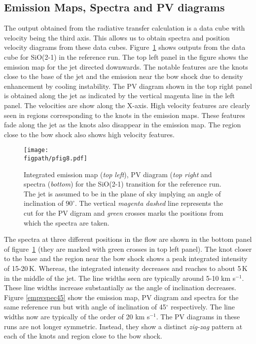 \documentclass[useAMS,usenatbib]{mn2e}
\newcommand{\figpath}{/home/phybva/SiOJets_New/PAPER/NEWFIGS}
\begin{document}
\subsection{Emission Maps, Spectra and PV diagrams}
\label{ssec:emspecpv}
The output obtained from the radiative transfer calculation is a data
cube with velocity being the third axis. This allows us to obtain
spectra and position velocity diagrams from these data cubes. 
Figure~\ref{empvspec90} shows outputs from the data
cube for SiO(2-1) in the reference run. 
The top left panel in the figure shows the emission map for the jet
directed downwards. The notable features are the knots close to the
base of the jet and the emission near the bow shock due to density
enhancement by cooling instability. The PV diagram shown in the top
right panel is obtained along the jet as indicated by the vertical magenta
line in the left panel. The velocities are show along the X-axis. High velocity features
are clearly seen in regions corresponding to the knots in the emission
maps. These features fade along the jet as the knots also disappear in
the emission map. The region close to the bow shock also shows high
velocity features.
%

\begin{figure}
 \texttt{[image: \\figpath/pfig8.pdf]}%
 \caption{Integrated emission map ({\it top left}), PV diagram ({\it top right}
   and spectra ({\it bottom}) for the
   SiO(2-1) transition for the reference run. 
   The jet is assumed to be in the plane of sky implying an angle of
   inclination of $90^{\circ}$. The vertical {\it magenta dashed} line
   represents the cut for the PV digram and {\it green} crosses marks the positions from which the spectra are taken.} 
\label{empvspec90}
\end{figure}

The spectra at three different positions in the flow are shown in the
bottom panel of figure~\ref{empvspec90} (they are marked with green
crosses in top left panel). The knot closer to the base and the region near the bow shock 
shows a peak integrated intensity of 15-20\,K. Whereas, the integrated 
intensity decreases and reaches to about 5\,K in the middle of the jet.
The line widths seen are typically around 5-10 km s$^{-1}$.
These line widths increase substantially as the angle of inclination
decreases. Figure \ref{empvspec45} show the
emission map, PV diagram and spectra for the same reference run but
with angle of inclination of 45$^{\circ}$
respectively. The line 
widths now are typically of the order of 20 km s$^{-1}$. 
The PV diagrams in these runs are not longer symmetric. Instead, they show a distinct {\it zig-zag}
pattern at each of the knots and region close to the bow shock.
\end{document}
